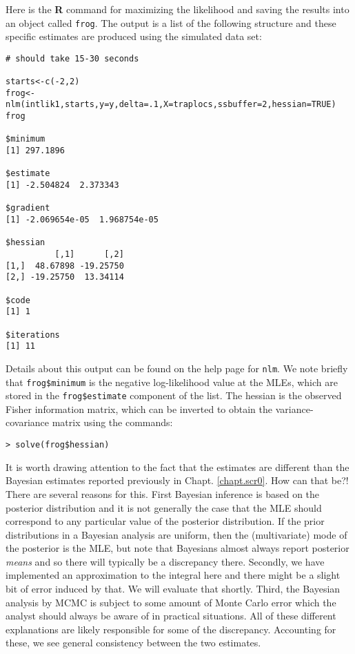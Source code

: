 Here is the {\bf R} command for maximizing the likelihood and saving the
results into an object called \mbox{\tt frog}.  The output is a list of the
following structure and these specific estimates are produced using
the simulated data set:

{\small 
\begin{verbatim}
# should take 15-30 seconds

starts<-c(-2,2)
frog<-nlm(intlik1,starts,y=y,delta=.1,X=traplocs,ssbuffer=2,hessian=TRUE)
frog

$minimum
[1] 297.1896

$estimate
[1] -2.504824  2.373343

$gradient
[1] -2.069654e-05  1.968754e-05

$hessian
          [,1]      [,2]
[1,]  48.67898 -19.25750
[2,] -19.25750  13.34114

$code
[1] 1

$iterations
[1] 11
\end{verbatim}
} 
Details about this output can be found on the help page for
\mbox{\tt nlm}. We note briefly that \mbox{\tt frog\$minimum} is the
negative log-likelihood value at the MLEs, which are stored in the
\mbox{\tt frog\$estimate} component of the list. The hessian is the
observed Fisher information matrix, which can be inverted to obtain
the variance-covariance matrix using the commands:
\begin{verbatim}
> solve(frog$hessian)
\end{verbatim}

It is worth drawing attention to the fact that the estimates are
different than the Bayesian estimates reported previously in Chapt. \ref{chapt.scr0}.
How can that be?!  There are several reasons for
this.  First Bayesian inference is based on the posterior distribution
and it is not generally the case that the MLE should correspond to any
particular value of the posterior distribution. If the prior
distributions in a Bayesian analysis are uniform, then the
(multivariate) mode of the
posterior is the MLE, but note that Bayesians almost always report
posterior {\it means} and so there will typically be a discrepancy
there. Secondly, we have implemented an approximation to the integral
here and there might be a slight bit of error induced by that. We will
evaluate that shortly. Third, the Bayesian analysis by MCMC is subject
to some amount of Monte Carlo error which the analyst should always be
aware of in practical situations.  All of these different explanations
are likely responsible for some of the discrepancy. Accounting for
these, we see general consistency between the
two estimates.

